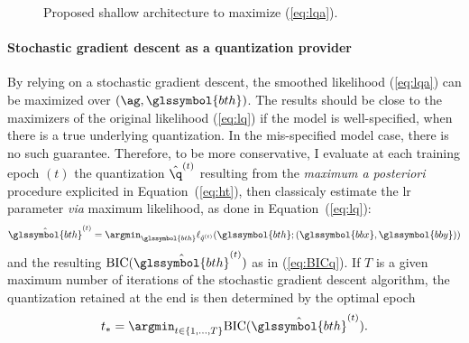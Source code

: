 \begin{figure}[h!]
\caption{Proposed shallow architecture to maximize (\ref{eq:lqa}).}
\label{fig:nn}
\end{figure}


\paragraph{Stochastic gradient descent as a quantization provider}

By relying on a stochastic gradient descent, the smoothed likelihood (\ref{eq:lqa}) can be maximized over $\left(\ag, \glssymbol{bth} \right)$. The results should be close to the maximizers of the original likelihood (\ref{eq:lq}) if the model is well-specified, when there is a true underlying quantization. In the mis-specified model case, there is no such guarantee. Therefore, to be more conservative, I evaluate at each training epoch $(t)$ the quantization $\hat{\q}^{(t)}$ resulting from the \textit{maximum a posteriori} procedure explicited in Equation~(\ref{eq:ht}), then classicaly estimate the \gls{lr} parameter \textit{via} maximum likelihood, as done in Equation~(\ref{eq:lq}):
\[\hat{\glssymbol{bth}}^{(t)} = \argmin_{\glssymbol{bth}} \ell_{\hat{q}^{(t)}}(\glssymbol{bth}; (\glssymbol{bbx},\glssymbol{bby}))\]
and the resulting $\mbox{BIC}(\hat{\glssymbol{bth}}^{(t)})$ as in (\ref{eq:BICq}). If $T$ is a given maximum number of iterations of the stochastic gradient descent algorithm, the quantization retained at the end is then determined by the optimal epoch
\begin{equation} \label{eq:opt_epoch}
t_*=\argmin_{t\in \{1,\ldots, T\}} \mbox{BIC}(\hat{\glssymbol{bth}}^{(t)}).
\end{equation}
 

